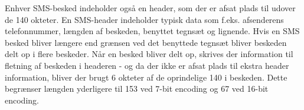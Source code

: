 Enhver SMS-besked indeholder også en header\cite{sms_pdu}, som der er afsat plads til udover de 140 okteter. En SMS-header indeholder typisk data som f.eks. afsenderens telefonnummer, længden af beskeden, benyttet tegnsæt og lignende. Hvis en SMS besked bliver længere end grænsen ved det benyttede tegnsæt bliver beskeden delt op i flere beskeder. Når en besked bliver delt op, skrives der information til fletning af beskeden i headeren - og da der ikke er afsat plads til ekstra header information, bliver der brugt 6 okteter af de oprindelige 140 i beskeden. Dette begrænser længden yderligere til 153 ved 7-bit encoding og 67 ved 16-bit encoding. 
